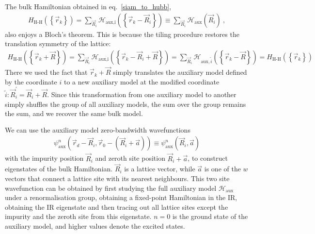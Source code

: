 \documentclass{report}
\numberwithin{equation}{section}
\begin{document}
The bulk Hamiltonian obtained in eq.~\ref{siam_to_hubb},
\begin{equation}\begin{aligned}
	H_\text{H-H}\left(\left\{\vec r_k\right\}\right) = \sum_{\vec R_i} \mathcal{H}_\text{aux,i}\left(\left\{\vec r_k - \vec R_i\right\}\right) \equiv \sum_{\vec R_i} \mathcal{H}_\text{aux}\left(\vec R_i\right)~,
\end{aligned}\end{equation}
also enjoys a Bloch's theorem. This is because the tiling procedure restores the translation symmetry of the lattice:
\begin{equation}\begin{aligned}
	H_\text{H-H}\left(\left\{\vec r_k + \vec R\right\}\right) =  \sum_{\vec R_i}\mathcal{H}_\text{aux,i}\left(\left\{\vec r_k - \vec R_i + \vec R\right\}\right) = \sum_{\vec R_i} \mathcal{H}_{\text{aux},\tilde i}\left(\left\{\vec r_k - \vec R\right\}\right) = H_\text{H-H}(\left\{\vec r_k\right\})
\end{aligned}\end{equation}
There we used the fact that \(\vec r_k + \vec R\) simply translates the auxiliary model defined by the coordinate \(i\) to a new auxiliary model at the modified coordinate \(\tilde i: \vec R_i^\prime = \vec R_i + \vec R\). Since this transformation from one auxiliary model to another simply shuffles the group of all auxiliary models, the sum over the group remains the sum, and we recover the same bulk model.

We can use the auxiliary model zero-bandwidth wavefunctions 
\begin{equation}\begin{aligned}
\psi^n_\text{aux}\left(\vec r_d - \vec R_i, \vec r_0 - \left(\vec R_i + \vec a\right)  \right) \equiv \psi^n_\text{aux}\left(\vec R_i, \vec a\right)
\end{aligned}\end{equation}
with the impurity position \(\vec R_i\) and zeroth site position \(\vec R_i + \vec a\), to construct eigenstates of the bulk Hamiltonian. \(\vec R_i\) is a lattice vector, while \(\vec a\) is one of the \(w\) vectors that connect a lattice site with its nearest neighbours. This two site wavefunction can be obtained by first studying the full auxiliary model \(\mathcal{H}_\text{aux}\) under a renormalisation group, obtaining a fixed-point Hamiltonian in the IR, obtaining the IR eigenstate and then tracing out all lattice sites except the impurity and the zeroth site from this eigenstate. \(n=0\) is the ground state of the auxiliary model, and higher values denote the excited states.
\end{document}
